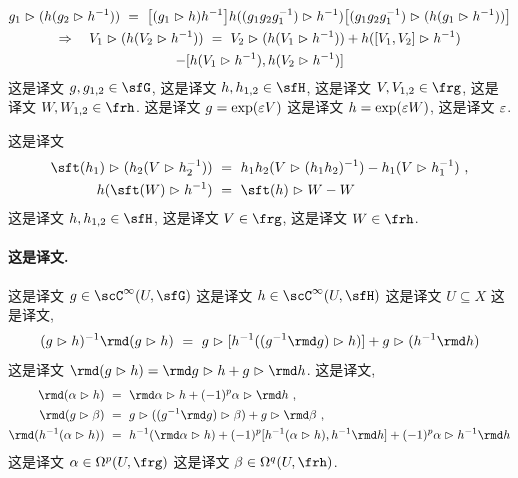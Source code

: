 \documentclass[
    affil-it, %
    auth-lg, %
    british, %
    compression, %
    contents, %
    custom-packages={}, %
    references={bigone}, %
]{lib/preprint}
\begin{document}
\begin{body}
\begin{subequations}
\begin{equation}
                \begin{gathered}
                    g_1\acton(h(g_2\acton h^{-1}))\ =\ \big[(g_1\acton h)h^{-1}\big]h((g_1 g_2 g_1^{-1})\acton h^{-1})\big[(g_1 g_2 g_1^{-1})\acton(h(g_1\acton h^{-1}))\big]
                    \\
                    \Rightarrow\quad V_1\acton(h(V_2\acton h^{-1}))\ =\ V_2\acton(h(V_1\acton h^{-1}))+h([V_1,V_2]\acton h^{-1})
                    \\
                    -[h(V_1\acton h^{-1}),h(V_2\acton h^{-1})]
                \end{gathered}
            \end{equation}
        \end{subequations}  这是译文 $g,g_{1,2}\in\sfG$, 这是译文 $h,h_{1,2}\in\sfH$, 这是译文 $V,V_{1,2}\in\frg$, 这是译文 $W,W_{1,2}\in\frh$. 这是译文 $g=\exp(\varepsilon V)$ 这是译文 $h=\exp(\varepsilon W)$, 这是译文 $\varepsilon$.

这是译文 
        \begin{subequations}
            \begin{align}
                \sft(h_1)\acton(h_2(V\acton h_2^{-1}))\ &=\ h_1h_2(V\acton (h_1h_2)^{-1})-h_1(V\acton h_1^{-1})~,\label{eq:app_identity_ht(B)/h}
                \\
                h(\sft(W)\acton h^{-1})\ &=\ \sft(h)\acton W-W
            \end{align}
        \end{subequations}  这是译文 $h,h_{1,2}\in\sfH$, 这是译文 $V\in\frg$, 这是译文 $W\in\frh$.

        \paragraph{这是译文.}
这是译文 $g\in\scC^\infty(U,\sfG)$ 这是译文 $h\in\scC^\infty(U,\sfH)$ 这是译文 $U\subseteq X$ 这是译文,         \begin{equation}
            (g\acton h)^{-1}\rmd(g\acton h)\ =\ g\acton[ h^{-1}((g^{-1}\rmd g)\acton h)]+g\acton( h^{-1}\rmd h)
        \end{equation}  这是译文 $\rmd(g\acton h)=\rmd g\acton h+g\acton\rmd h$. 这是译文, 
        \begin{subequations}
            \begin{align}
                \rmd(\alpha\acton h)\ &=\ \rmd\alpha\acton h+(-1)^p\alpha\acton\rmd h~,\label{eq:app_identity_d(gLambda)}
                \\
                \rmd(g\acton\beta)\ &=\ g\acton((g^{-1}\rmd g)\acton\beta)+g\acton\rmd\beta~,\label{eq:app_identity_d(hA/h)}
                \\
                \rmd(h^{-1}(\alpha\acton h))\ &=\ h^{-1}(\rmd\alpha\acton h)+(-1)^p[h^{-1}(\alpha\acton h),h^{-1}\rmd h]+(-1)^p\alpha\acton h^{-1}\rmd h 
            \end{align}
        \end{subequations}  这是译文 $\alpha\in\Omega^p(U,\frg)$ 这是译文 $\beta\in\Omega^q(U,\frh)$.
        

\end{body}
\end{document}
